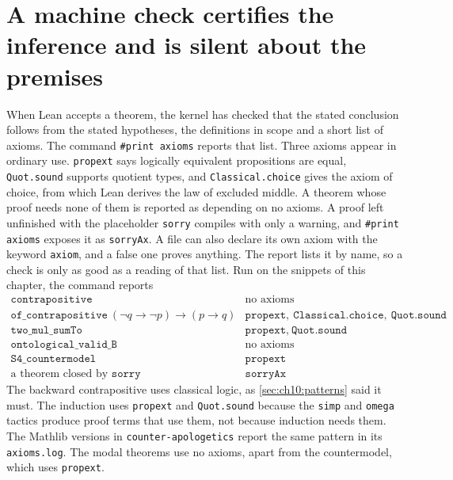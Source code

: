 \section{A machine check certifies the inference and is silent about the premises}\label{sec:ch10:audit}

When Lean accepts a theorem, the kernel has checked that the stated conclusion follows from the stated hypotheses, the definitions in scope and a short list of axioms. The command \texttt{\#print axioms} reports that list. Three axioms appear in ordinary use. \texttt{propext} says logically equivalent propositions are equal, \texttt{Quot.sound} supports quotient types, and \texttt{Classical.choice} gives the axiom of choice, from which Lean derives the law of excluded middle. A theorem whose proof needs none of them is reported as depending on no axioms. A proof left unfinished with the placeholder \texttt{sorry} compiles with only a warning, and \texttt{\#print axioms} exposes it as \texttt{sorryAx}. A file can also declare its own axiom with the keyword \texttt{axiom}, and a false one proves anything. The report lists it by name, so a check is only as good as a reading of that list. Run on the snippets of this chapter, the command reports
\begin{equation}
\begin{array}{ll}
\texttt{contrapositive} & \text{no axioms}\\
\texttt{of\_contrapositive}\ (\neg q\to\neg p)\to(p\to q) & \texttt{propext},\ \texttt{Classical.choice},\ \texttt{Quot.sound}\\
\texttt{two\_mul\_sumTo} & \texttt{propext},\ \texttt{Quot.sound}\\
\texttt{ontological\_valid\_B} & \text{no axioms}\\
\texttt{S4\_countermodel} & \texttt{propext}\\
\text{a theorem closed by } \texttt{sorry} & \texttt{sorryAx}
\end{array}
\label{eq:ch10:axioms}
\end{equation}
The backward contrapositive uses classical logic, as \cref{sec:ch10:patterns} said it must. The induction uses \texttt{propext} and \texttt{Quot.sound} because the \texttt{simp} and \texttt{omega} tactics produce proof terms that use them, not because induction needs them. The Mathlib versions in \texttt{counter-apologetics} report the same pattern in its \texttt{axioms.log}. The modal theorems use no axioms, apart from the countermodel, which uses \texttt{propext}.


